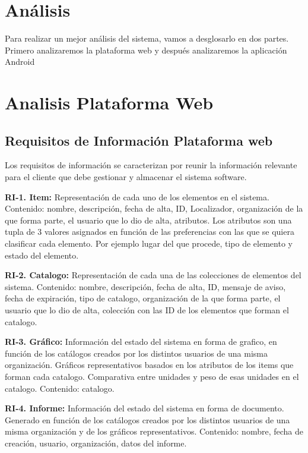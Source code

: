 \documentclass[a4paper,11pt]{book}
\begin{document}
\section{Análisis}
Para realizar un mejor análisis del sistema, vamos a desglosarlo en dos partes. Primero analizaremos la plataforma web y después analizaremos la aplicación Android 

\section{Analisis Plataforma Web}
\subsection{Requisitos de Información Plataforma web}

Los requisitos de información se caracterizan por  reunir la información 	relevante para el cliente que debe gestionar y almacenar el sistema software.\par 

\textbf{RI-1. Item:} Representación de cada uno de los elementos en el sistema. 
Contenido: nombre, descripción, fecha de alta, ID, Localizador, organización de la que forma parte, el usuario que lo dio de alta, atributos. Los atributos son una tupla de 3 valores asignados en función de las preferencias con las que se quiera clasificar  cada elemento. Por ejemplo lugar del que procede, tipo de elemento y estado del elemento.


\textbf{RI-2. Catalogo:} Representación de cada una de las colecciones de elementos del sistema. Contenido: nombre, descripción, fecha de alta, ID, mensaje de aviso, fecha de expiración, tipo de catalogo,  organización de la que forma parte, el usuario que lo dio de alta, colección con las ID de los elementos que forman el catalogo.

\textbf{RI-3. Gráfico:} Información del estado del sistema en forma de grafico, en función de los catálogos creados por los distintos usuarios de una misma organización. Gráficos representativos basados en los atributos de los items que forman cada catalogo. Comparativa entre unidades y peso de esas unidades en el catalogo. 
Contenido: catalogo.

\textbf{RI-4. Informe:} Información del estado del sistema en forma de documento. Generado en función de los catálogos creados por los distintos usuarios de una misma organización y de los gráficos representativos. 
Contenido: nombre, fecha de creación, usuario, organización, datos del informe. 
\end{document}
